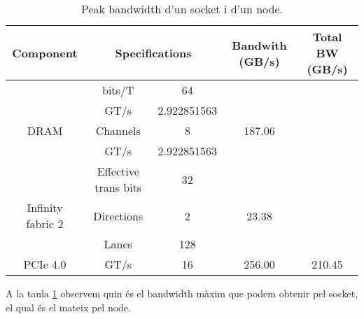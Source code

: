 \begin{table}[h]
\begin{tabular}{c|c|c||c|c}
    \hline
Component                           & \multicolumn{2}{c||}{Specifications}                                         & Bandwith (GB/s)          & Total BW (GB/s)          \\ \hline  \hline 
                                    & \cellcolor[HTML]{EFEFEF}bits/T               & \cellcolor[HTML]{EFEFEF}64  &                          &                          \\
                                    & GT/s                                         & 2.922851563                 &                          &                          \\
    \multirow{-3}{*}{DRAM}              & \cellcolor[HTML]{EFEFEF}Channels             & \cellcolor[HTML]{EFEFEF}8   & \multirow{-3}{*}{187.06} &                          \\ \cline{1-4}
                                    & GT/s                                         & 2.922851563                 &                          &                          \\
                                    & \cellcolor[HTML]{EFEFEF}Effective trans bits & \cellcolor[HTML]{EFEFEF}32  &                          &                          \\
    \multirow{-3}{*}{Infinity fabric 2} & Directions                                   & 2                           & \multirow{-3}{*}{23.38}  &                          \\ \cline{1-4}
                                    & \cellcolor[HTML]{EFEFEF}Lanes                & \cellcolor[HTML]{EFEFEF}128 &                          &                          \\
\multirow{-2}{*}{PCIe 4.0}          & GT/s                                         & 16                          & \multirow{-2}{*}{256.00} & \multirow{-8}{*}{210.45} \\ \hline
\end{tabular}
    \caption{Peak bandwidth d'un socket i d'un node.}
    \label{tab:peak_bw}
\end{table}

A la taula \ref{tab:peak_bw} observem quin és el bandwidth màxim que podem obtenir pel socket, el qual és el mateix pel node.

